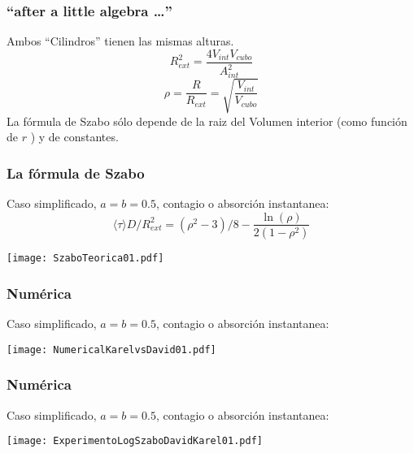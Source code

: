 \documentclass[mathserif,serif]{beamer}
\begin{document}
   
  \begin{frame}
    \frametitle{``after a little algebra \ldots''}
    Ambos ``Cilindros'' tienen las mismas alturas.
    \begin{equation}\label{volumeabd}
      R_{ext}^2=\frac{4 V_{int} V_{cubo}}{A_{int}^2}
    \end{equation}
    \begin{equation}
      \rho=\frac{R}{R_{ext}}=\sqrt{\frac{V_{int}}{V_{cubo}}}
    \end{equation}
    La fórmula de Szabo sólo depende de la raiz del Volumen
    interior (como función de $r$ ) y de constantes.
  \end{frame}
  
  
  \begin{frame}
    \frametitle{La fórmula de Szabo}
    Caso simplificado, $a=b=0.5$, contagio o absorción instantanea:
    \begin{equation}
      \langle \tau  \rangle D /R_{ext}^2=
      (\rho^2-3)/8-\frac{\ln(\rho)}{2(1-\rho^2)}
    \end{equation}
    \begin{center}
      \texttt{[image: SzaboTeorica01.pdf]}    
    \end{center}
    \end{frame}
  
  
  \begin{frame}
    \frametitle{Numérica}
    Caso simplificado, $a=b=0.5$, contagio o absorción instantanea:
 
    \begin{center}
      \texttt{[image: NumericalKarelvsDavid01.pdf]}    
    \end{center}
  \end{frame}

  
  
  \begin{frame}
    \frametitle{Numérica}
    Caso simplificado, $a=b=0.5$, contagio o absorción instantanea:
 
    \begin{center}
      \texttt{[image: ExperimentoLogSzaboDavidKarel01.pdf]}    
    \end{center}
  \end{frame}
  
\end{document}
